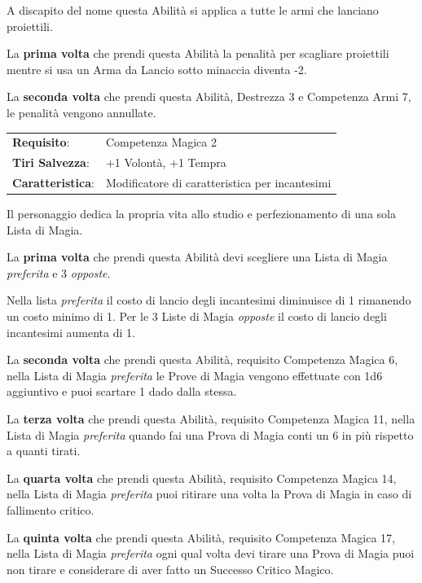 \begin{multicols}{2}
A discapito del nome questa Abilità si applica a tutte le armi che lanciano proiettili.

La \textbf{prima volta} che prendi questa Abilità la penalità per scagliare proiettili mentre si usa un Arma da Lancio sotto minaccia diventa -2.

La \textbf{seconda volta} che prendi questa Abilità, Destrezza 3 e Competenza Armi 7, le penalità vengono annullate.

\noindent\begin{tabularx}{\linewidth}{>{\raggedright\arraybackslash}p{2.5cm}X}
\rowcolor{gray!20}\textbf{Requisito}: & Competenza Magica 2\\
\textbf{Tiri Salvezza}: & +1 Volontà, +1 Tempra\\
\rowcolor{gray!20}\textbf{Caratteristica}: & Modificatore di caratteristica per incantesimi\\
\end{tabularx}\smallskip

Il personaggio dedica la propria vita allo studio e perfezionamento di una sola Lista di Magia.

La \textbf{prima volta} che prendi questa Abilità devi scegliere una Lista di Magia \emph{preferita} e 3 \emph{opposte}.

Nella lista \emph{preferita} il costo di lancio degli incantesimi diminuisce di 1 rimanendo un costo minimo di 1. Per le 3 Liste di Magia \emph{opposte} il costo di lancio degli incantesimi aumenta di 1.

La \textbf{seconda volta} che prendi questa Abilità, requisito Competenza Magica 6, nella Lista di Magia \emph{preferita} le Prove di Magia vengono effettuate con 1d6 aggiuntivo e puoi scartare 1 dado dalla stessa.

La \textbf{terza volta} che prendi questa Abilità, requisito Competenza Magica 11, nella Lista di Magia \emph{preferita} quando fai una Prova di Magia conti un 6 in più rispetto a quanti tirati.

La \textbf{quarta volta} che prendi questa Abilità, requisito Competenza Magica 14, nella Lista di Magia \emph{preferita} puoi ritirare una volta la Prova di Magia in caso di fallimento critico.

La \textbf{quinta volta} che prendi questa Abilità, requisito Competenza Magica 17, nella Lista di Magia \emph{preferita} ogni qual volta devi tirare una Prova di Magia puoi non tirare e considerare di aver fatto un Successo Critico Magico.


\end{multicols}
